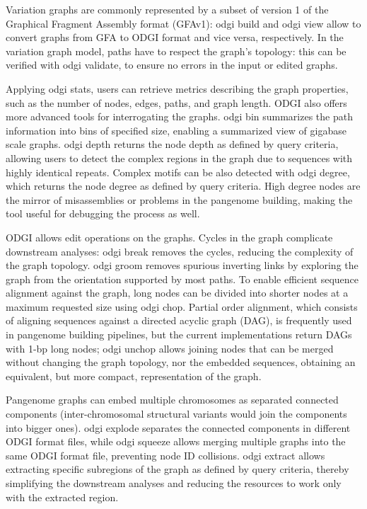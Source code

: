 \documentclass{bioinfo}
\begin{document}

Variation graphs are commonly represented by a subset of version 1 of the Graphical Fragment Assembly format (GFAv1): odgi build and odgi view allow to convert graphs from GFA to ODGI format and vice versa, respectively.
In the variation graph model, paths have to respect the graph’s topology: this can be verified with odgi validate, to ensure no errors in the input or edited graphs.

Applying odgi stats, users can retrieve metrics describing the graph properties, such as the number of nodes, edges, paths, and graph length.
ODGI also offers more advanced tools for interrogating the graphs. odgi bin summarizes the path information into bins of specified size, enabling a summarized view of gigabase scale graphs.
odgi depth returns the node depth as defined by query criteria, allowing users to detect the complex regions in the graph due to sequences with highly identical repeats.
Complex motifs can be also detected with odgi degree, which returns the node degree as defined by query criteria.
High degree nodes are the mirror of misassemblies or problems in the pangenome building, making the tool useful for debugging the process as well.

ODGI allows edit operations on the graphs.
Cycles in the graph complicate downstream analyses: odgi break removes the cycles, reducing the complexity of the graph topology.
odgi groom removes spurious inverting links by exploring the graph from the orientation supported by most paths.
To enable efficient sequence alignment against the graph, long nodes can be divided into shorter nodes at a maximum requested size using odgi chop.
Partial order alignment, which consists of aligning sequences against a directed acyclic graph (DAG), is frequently used in pangenome building pipelines, but the current implementations return DAGs with 1-bp long nodes; odgi unchop allows joining nodes that can be merged without changing the graph topology, nor the embedded sequences, obtaining an equivalent, but more compact, representation of the graph.

Pangenome graphs can embed multiple chromosomes as separated connected components (inter-chromosomal structural variants would join the components into bigger ones).
odgi explode separates the connected components in different ODGI format files, while odgi squeeze allows merging multiple graphs into the same ODGI format file, preventing node ID collisions.
odgi extract allows extracting specific subregions of the graph as defined by query criteria, thereby simplifying the downstream analyses and reducing the resources to work only with the extracted region.
\end{document}
